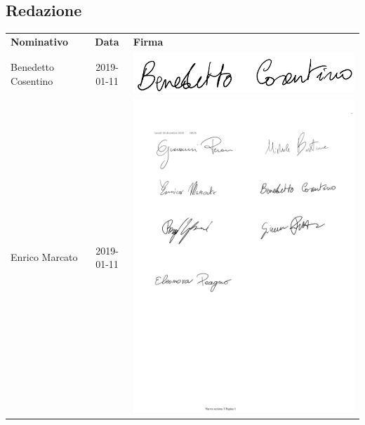 \subsection{Redazione}

{\renewcommand{\arraystretch}{1.4}%
\begin{table}[H]
	\centering
	\begin{tabular}{| l | c | >{\centering\arraybackslash}m{8cm}
			|} 
		\rowcolor{LightBlue}
		\textbf{\color{white}Nominativo} & 
		\textbf{\color{white}Data} & 
		\textbf{\color{white}Firma} \\
	
	Benedetto Cosentino & 2019-01-11 & \includegraphics[scale=0.5]{images/firme/benedetto.pdf}\\
	Enrico Marcato & 2019-01-11 & \includegraphics[scale=0.65]{images/firme/enrico.pdf}\\ \hline
\end{tabular}
\end{table}
}
